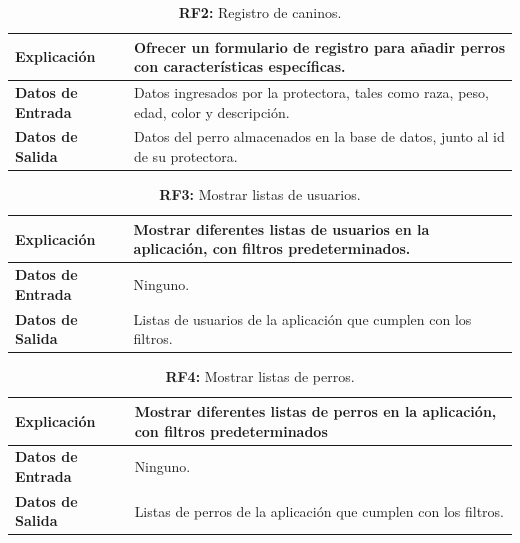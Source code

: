 \documentclass[a4paper, 12pt]{article}
\begin{document}
\begin{table}[H]
\captionsetup{justification=raggedright,singlelinecheck=false}
\caption{\textbf{RF2:} Registro de caninos.}
\label{tab:RF2}
	\begin{tabular}{|m{5cm}|m{10cm}|}
	\hline
	\textbf{Explicación} & Ofrecer un formulario de registro para añadir perros con características específicas. \\ 
	\hline
	\textbf{Datos de Entrada} & Datos ingresados por la protectora, tales como raza, peso, edad, color y descripción. \\ 
	\hline
	\textbf{Datos de Salida} & Datos del perro almacenados en la base de datos, junto al id de su protectora. \\ 
	\hline
\end{tabular}
\end{table}

\begin{table}[H]
\captionsetup{justification=raggedright,singlelinecheck=false}
\caption{\textbf{RF3:} Mostrar listas de usuarios.}
\label{tab:RF23}
	\begin{tabular}{|m{5cm}|m{10cm}|}
	\hline
	\textbf{Explicación} & Mostrar diferentes listas de usuarios en la aplicación, con filtros predeterminados. \\ 
	\hline
	\textbf{Datos de Entrada} & Ninguno. \\ 
	\hline
	\textbf{Datos de Salida} & Listas de usuarios de la aplicación que cumplen con los filtros.  \\ 
	\hline
\end{tabular}
\end{table}

\begin{table}[H]
\captionsetup{justification=raggedright,singlelinecheck=false}
\caption{\textbf{RF4:} Mostrar listas de perros.}
\label{tab:RF4}
	\begin{tabular}{|m{5cm}|m{10cm}|}
	\hline
	\textbf{Explicación} & Mostrar diferentes listas de perros en la aplicación, con filtros predeterminados \\ 
	\hline
	\textbf{Datos de Entrada} & Ninguno. \\ 
	\hline
	\textbf{Datos de Salida} & Listas de perros de la aplicación que cumplen con los filtros. \\ 
	\hline
\end{tabular}
\end{table}
\end{document}
